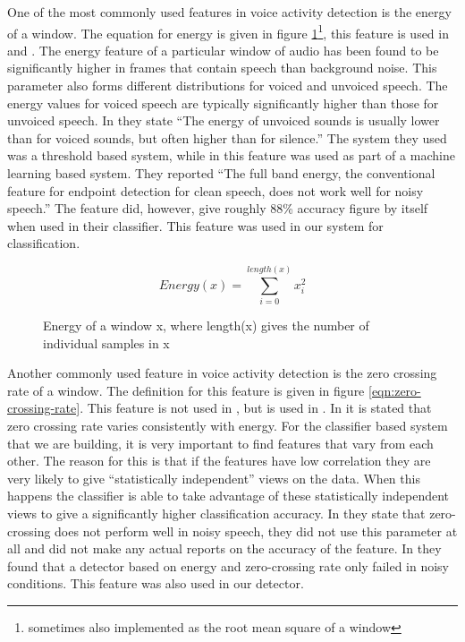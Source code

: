 \documentclass[ %
                    author={Sam Phippen},
                supervisor={Dr. Rafal Bogacz},
                     title={Real time voice activity detectors in noisy personal computing environments},
                  subtitle={},
                    degree={MEng},
                      year={2012} ]{thesis}
\begin{document}
One of the most commonly used features in voice activity detection is the
energy of a window. The equation for energy is given in figure
\ref{eqn:energy}\footnote{ sometimes also implemented as the root mean square
of a window}, this feature is used in
\cite{shin}\cite{sakhnov}\cite{gokhun}\cite{haigh}\cite{atal} and \cite{sohn2}.
The energy feature of a particular window of audio has been found to be
significantly higher in frames that contain speech than background
noise\cite{atal}. This parameter also forms different distributions for voiced
and unvoiced speech. The energy values for voiced speech are typically
significantly higher than those for unvoiced speech. In \cite{atal} they state
``The energy of unvoiced sounds is usually lower than for voiced sounds, but
often higher than for silence.'' The system they used was a threshold based
system, while in \cite{shin} this feature was used as part of a machine
learning based system.  They reported ``The full band energy, the conventional
feature for endpoint detection for clean speech, does not work well for noisy
speech.'' The feature did, however, give roughly 88\% accuracy figure by itself
when used in their classifier. This feature was used in our system for
classification.

\begin{figure}
    $$Energy(x) = \sum_{i=0}^{length(x)}x_i^2$$
    \caption{Energy of a window x, where length(x) gives the number of individual
    \label{eqn:energy}
    samples in x}
\end{figure}

Another commonly used feature in voice activity detection is the zero crossing
rate of a window. The definition for this feature is given in figure
\ref{eqn:zero-crossing-rate}. This feature is not used in \cite{shin}, but is
used in \cite{atal}. In \cite{atal} it is stated that zero crossing rate varies
consistently with energy. For the classifier based system that we are building,
it is very important to find features that vary from each other. The reason for
this is that if the features have low correlation they are very likely to give
``statistically independent'' views on the data. When this happens the classifier
is able to take advantage of these statistically independent views to give a
significantly higher classification accuracy. In \cite{shin} they state that
zero-crossing does not perform well in noisy speech, they did not use this
parameter at all and did not make any actual reports on the accuracy of the
feature. In \cite{haigh} they found that a detector based on energy and
zero-crossing rate only failed in noisy conditions. This feature was also used
in our detector.
\end{document}
